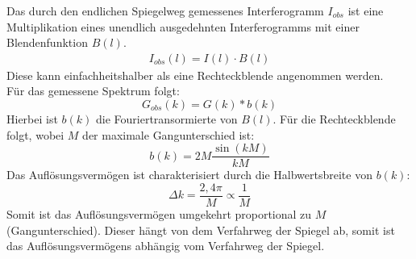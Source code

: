 Das durch den endlichen Spiegelweg gemessenes Interferogramm $I_{obs}$ ist eine Multiplikation eines unendlich ausgedehnten Interferogramms mit einer Blendenfunktion $B(l)$.
\begin{align}
    I_{obs}(l)=I(l)\cdot B(l)
\end{align}
Diese kann einfachheitshalber als eine Rechteckblende angenommen werden.\\
Für das gemessene Spektrum folgt:
\begin{equation}
    G_{obs}(k)=G(k)*b(k)
\end{equation}
Hierbei ist $b(k)$ die Fouriertransormierte von $B(l)$.
Für die Rechteckblende folgt, wobei $M$ der maximale Gangunterschied ist:
\begin{equation}
    b(k)=2M\frac{\sin\left(kM\right)}{kM}
\end{equation}
Das Auflösungsvermögen ist charakterisiert durch die Halbwertsbreite von $b(k)$:
\begin{equation}
    \Delta k = \frac{2,4\pi}{M}\propto\frac{1}{M}
\end{equation}
Somit ist das Auflösungsvermögen umgekehrt proportional zu $M$ (Gangunterschied).
Dieser hängt von dem Verfahrweg der Spiegel ab, somit ist das Auflösungsvermögens abhängig vom Verfahrweg der Spiegel.